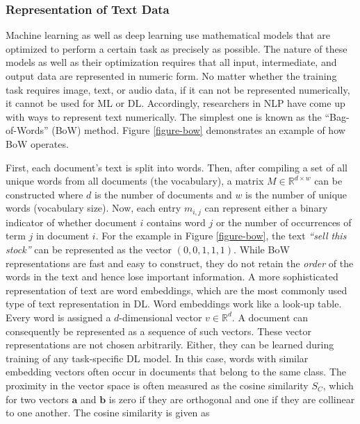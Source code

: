 \subsubsection{Representation of Text Data}
\label{section-text-repr-theory}
Machine learning as well as deep learning use mathematical models that are optimized to perform a certain task as precisely as possible. The nature of these models as well as their optimization requires that all input, intermediate, and output data are represented in numeric form. No matter whether the training task requires image, text, or audio data, if it can not be represented numerically, it cannot be used for ML or DL. Accordingly, researchers in NLP have come up with ways to represent text numerically. The simplest one is known as the ``Bag-of-Words'' (BoW) method. Figure \ref{figure-bow} demonstrates an example of how BoW operates.



 First, each document's text is split into words. Then, after compiling a set of all unique words from all documents (the vocabulary), a matrix $M \in \mathbb{R}^{d \times w}$ can be constructed where $d$ is the number of documents and $w$ is the number of unique words (vocabulary size). Now, each entry $m_{i,j}$ can represent either a binary indicator of whether document $i$ contains word $j$ or the number of occurrences of term $j$ in document $i$. For the example in Figure \ref{figure-bow}, the text \emph{``sell this stock''} can be represented as the vector $(0,0,1,1,1)$. While BoW representations are fast and easy to construct, they do not retain the \emph{order} of the words in the text and hence lose important information. \newline
 A more sophisticated representation of text are word embeddings, which are the most commonly used type of text representation in DL. Word embeddings work like a look-up table. Every word is assigned a $d$-dimensional vector $v \in \mathbb{R}^{d}$. A document can consequently be represented as a sequence of such vectors. These vector representations are not chosen arbitrarily. Either, they can be learned during training of any task-specific DL model. In this case, words with similar embedding vectors often occur in documents that belong to the same class. The proximity in the vector space is often measured as the cosine similarity $S_C$, which for two vectors $\bm{a}$ and $\bm{b}$ is zero if they are orthogonal and one if they are collinear to one another. The cosine similarity is given as

